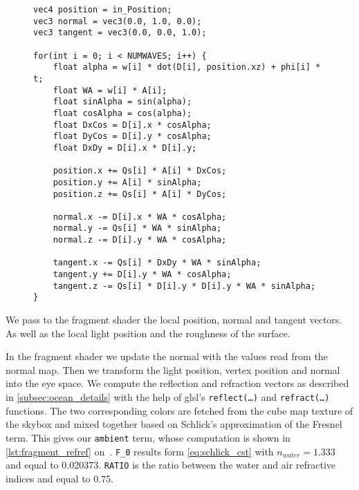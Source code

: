 \begin{figure}[ht!]
\begin{lstlisting}
vec4 position = in_Position;
vec3 normal = vec3(0.0, 1.0, 0.0);
vec3 tangent = vec3(0.0, 0.0, 1.0);

for(int i = 0; i < NUMWAVES; i++) {
    float alpha = w[i] * dot(D[i], position.xz) + phi[i] * t;
    float WA = w[i] * A[i];
    float sinAlpha = sin(alpha);
    float cosAlpha = cos(alpha);
    float DxCos = D[i].x * cosAlpha;
    float DyCos = D[i].y * cosAlpha;
    float DxDy = D[i].x * D[i].y;

    position.x += Qs[i] * A[i] * DxCos;
    position.y += A[i] * sinAlpha;
    position.z += Qs[i] * A[i] * DyCos;

    normal.x -= D[i].x * WA * cosAlpha;
    normal.y -= Qs[i] * WA * sinAlpha;
    normal.z -= D[i].y * WA * cosAlpha;

    tangent.x -= Qs[i] * DxDy * WA * sinAlpha;
    tangent.y += D[i].y * WA * cosAlpha;
    tangent.z -= Qs[i] * D[i].y * D[i].y * WA * sinAlpha;
}
\end{lstlisting}
\end{figure}

We pass to the fragment shader the local position, normal and tangent vectors.
As well as the local light position and the roughness of the surface.

In the fragment shader we update the normal with the values read from the normal
map. Then we transform the light position, vertex position and normal into the
eye space. We compute the reflection and refraction vectors as described in
\autoref{subsec:ocean_details} with the help of glsl's \texttt{reflect(\ldots)}
and \texttt{refract(\ldots)} functions. The two corresponding colors are fetched
from the cube map texture of the skybox and mixed together based on Schlick's
approximation of the Fresnel term. This gives our \texttt{ambient} term, whose
computation is shown in \autoref{lst:fragment_refref}
on~\pageref{lst:fragment_refref}. \texttt{F\_0} results form
\autoref{eq:schlick_cst} with $n_{water} = 1.333$ and equal to 0.020373.
\texttt{RATIO} is the ratio between the water and air refractive indices and
equal to 0.75.

